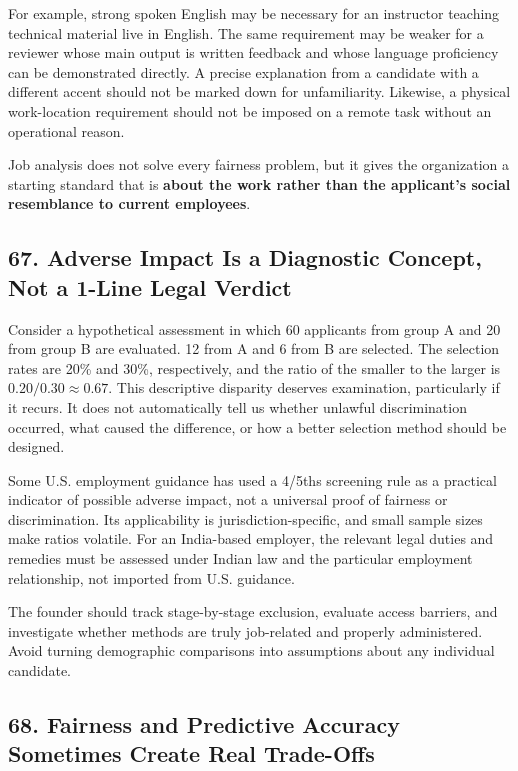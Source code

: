 For example, strong spoken English may be necessary for an instructor teaching technical material live in English. The same requirement may be weaker for a reviewer whose main output is written feedback and whose language proficiency can be demonstrated directly. A precise explanation from a candidate with a different accent should not be marked down for unfamiliarity. Likewise, a physical work-location requirement should not be imposed on a remote task without an operational reason.

Job analysis does not solve every fairness problem, but it gives the organization a starting standard that is \textbf{about the work rather than the applicant's social resemblance to current employees}.

\subsection*{67. Adverse Impact Is a Diagnostic Concept, Not a 1-Line Legal Verdict}

Consider a hypothetical assessment in which 60 applicants from group A and 20 from group B are evaluated. 12 from A and 6 from B are selected. The selection rates are 20\% and 30\%, respectively, and the ratio of the smaller to the larger is $0.20 / 0.30 \approx 0.67$. This descriptive disparity deserves examination, particularly if it recurs. It does not automatically tell us whether unlawful discrimination occurred, what caused the difference, or how a better selection method should be designed.

Some U.S. employment guidance has used a 4/5ths screening rule as a practical indicator of possible adverse impact, not a universal proof of fairness or discrimination. Its applicability is jurisdiction-specific, and small sample sizes make ratios volatile. For an India-based employer, the relevant legal duties and remedies must be assessed under Indian law and the particular employment relationship, not imported from U.S. guidance.

The founder should track stage-by-stage exclusion, evaluate access barriers, and investigate whether methods are truly job-related and properly administered. Avoid turning demographic comparisons into assumptions about any individual candidate.

\subsection*{68. Fairness and Predictive Accuracy Sometimes Create Real Trade-Offs}


